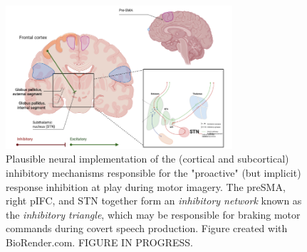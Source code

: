\documentclass[utf8]{template/frontiersSCNS} %
\begin{document}

\begin{figure}[ht] %
\begin{center}
\includegraphics[width=0.75\textwidth]{figures/inhibitory_triangle.png} %
\end{center}
\caption{Plausible neural implementation of the (cortical and subcortical) inhibitory mechanisms responsible for the "proactive" (but implicit) response inhibition at play during motor imagery. The preSMA, right pIFC, and STN together form an \textit{inhibitory network} known as the \textit{inhibitory triangle}, which may be responsible for braking motor commands during covert speech production. Figure created with BioRender.com. FIGURE IN PROGRESS.}\label{fig:2}
\end{figure}

\end{document}
